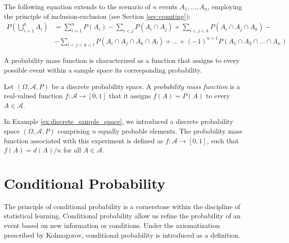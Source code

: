 The following equation extends to the scenario of $n$ events $A_1, \ldots, A_n$, employing the principle of inclusion-exclusion (see Section \ref{sec:counting}):
\begin{equation*}
\begin{split}
P \left( \bigcup_{i=1}^n A_i \right) & = \sum_{i=1}^n P \left( A_i \right) - \sum_{i<j} P \left( A_i \cap A_j \right) + \sum_{i<j<k} P \left( A_i \cap A_j \cap A_k \right) - \\
&  - \sum_{i<j<k<l} P \left( A_i \cap A_j \cap A_k \cap A_l \right) + \ldots +  (-1)^{n+1} P \left( A_1 \cap A_2 \cap \ldots \cap A_n \right) 
\end{split}
\end{equation*}

A probability mass function is characterized as a function that assigns to every possible event within a sample space its corresponding probability.

\begin{definition}
\label{def:probability_function}
Let $\left( \Omega, \mathcal{A} , P \right)$ be a discrete probability space. A \emph{probability mass function} is a real-valued function $f : \mathcal{A} \rightarrow [0, 1]$ that it assigns $f \left( A \right) = P \left( A \right)$ to every $A \in \mathcal{A}$.
\end{definition}

In Example \ref{ex:discrete_sample_space}, we introduced a discrete probability space $\left( \Omega, \mathcal{A}, P \right)$ comprising $n$ equally probable elements. The probability mass function associated with this experiment is defined as $f : \mathcal{A} \rightarrow [0, 1]$, such that $f \left( A \right) = d\left( A \right)/n$ for all $A \in \mathcal{A}$.

%
%

\section{Conditional Probability}
\label{sec:probability_conditional}

The principle of conditional probability is a cornerstone within the discipline of statistical learning. Conditional probability allow us refine the probability of an event based on new information or conditions. Under the axiomatization prescribed by Kolmogorov, conditional probability is introduced as a definition.

